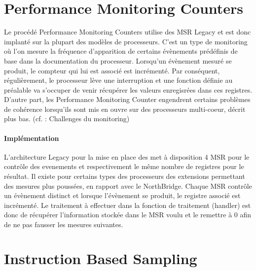 	\section{Performance Monitoring Counters}
		Le procédé Performance Monitoring Counters utilise des MSR Legacy et est donc implanté sur la plupart des modèles de processeurs. C'est un type de monitoring où l'on mesure la fréquence d'apparition de certains évènements prédéfinis de base dans la documentation du processeur. Lorsqu'un évènement mesuré se produit, le compteur qui lui est associé est incrémenté. Par conséquent, régulièrement, le processeur lève une interruption et une fonction définie au préalable va s'occuper de venir récupérer les valeurs enregisrées dans ces registres. D'autre part, les Performance Monitoring Counter engendrent certains problèmes de cohérence lorsqu'ils sont mis en ouvre sur des processeurs multi-coeur, décrit plus bas. (cf. : Challenges du monitoring)
	\paragraph{Implémentation}
		L'architecture Legacy pour la mise en place des \PMC met à disposition 4 MSR pour le contrôle des evenements et respectivement le même nombre de registres pour le résultat. Il existe pour certains types des processeurs des extensions permettant des mesures plus poussées, en rapport avec le NorthBridge. Chaque MSR contrôle un évènement distinct et lorsque l'évènement se produit, le registre associé est incrémenté. Le traitement à effectuer dans la fonction de traitement (handler) est donc de récupérer l'information stockée dans le MSR voulu et le remettre à 0 afin de ne pas fausser les mesures suivantes.
	\section{Instruction Based Sampling}
